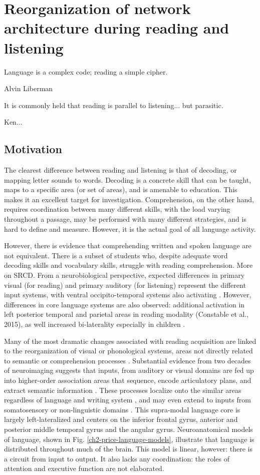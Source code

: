 \chapter{Reorganization of network architecture during reading and listening}

\epigraph{Language is a complex code; reading a simple cipher.}{Alvin Liberman}

\epigraph{It is commonly held that reading is parallel to listening... but parasitic.}{Ken...}

\section{Motivation}

The clearest difference between reading and listening is that of decoding, or mapping letter sounds to words. Decoding is a concrete skill that can be taught, maps to a specific area (or set of areas), and is amenable to education. This makes it an excellent target for investigation. Comprehension, on the other hand, requires coordination between many different skills, with the load varying throughout a passage, may be performed with many different strategies, and is hard to define and measure. However, it is the actual goal of all language activity. 

However, there is evidence that comprehending written and spoken language are not equivalent. There is a subset of students who, despite adequate word decoding skills and vocabulary skills, struggle with reading comprehension\citep{Nation2010, Spencer2011}. More on SRCD. From a neurobiological perspective, expected differences in primary visual (for reading) and primary auditory (for listening) represent the different input systems, with ventral occipito-temporal systems also activating \cite{Jobard2007}. However, differences in core language systems are also observed: additional activation in left posterior temporal and parietal areas in reading modality (Constable et al., 2015), as well increased bi-laterality especially in children \cite{Berl2010}. 

Many of the most dramatic changes associated with reading acquisition are linked to the reorganization of visual or phonological systems, areas not directly related to semantic or comprehension processes \cite{Schlaggar2006, Dahaene2015}. Substantial evidence from two decades of neuroimaging suggests that inputs, from auditory or visual domains are fed up into higher-order association areas that sequence, encode articulatory plans, and extract semantic information \cite{Price2012}. These processes localize onto the similar areas regardless of language and writing system \cite{Rueckl2016}, and may even extend to inputs from somatosensory or non-linguistic domains \cite{Xu2005}. This supra-modal language core is largely left-lateralized and centers on the inferior frontal gyrus, anterior and posterior middle temporal gyrus and the angular gyrus. Neuroanatomical models of language, shown in Fig. \ref{ch2-price-language-models}, illustrate that language is distributed throughout much of the brain. This model is linear, however: there is a circuit from input to output. It also lacks any coordination: the roles of attention and executive function are not elaborated.

